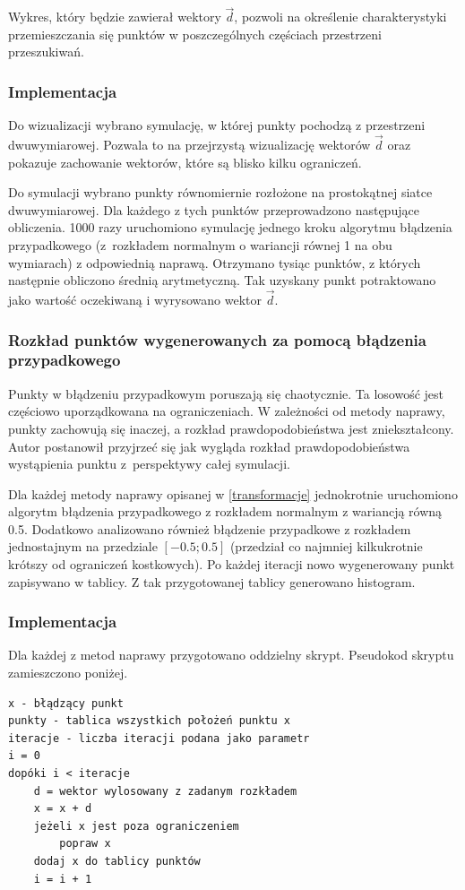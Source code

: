 \documentclass{mini}
\begin{document}
Wykres, który będzie zawierał wektory $\overrightarrow{d}$, pozwoli na określenie charakterystyki przemieszczania się punktów w poszczególnych częściach przestrzeni przeszukiwań.

\subsubsection*{Implementacja}
\hspace{3,4ex}Do wizualizacji wybrano symulację, w której punkty pochodzą z przestrzeni dwuwymiarowej. Pozwala to na przejrzystą wizualizację wektorów $\overrightarrow{d}$ oraz pokazuje zachowanie wektorów, które są blisko kilku ograniczeń.

Do symulacji wybrano punkty równomiernie rozłożone na prostokątnej siatce dwuwymiarowej. Dla każdego z tych punktów przeprowadzono następujące obliczenia. 1000 razy uruchomiono symulację jednego kroku algorytmu błądzenia przypadkowego (z~rozkładem normalnym o wariancji równej 1 na obu wymiarach) z odpowiednią naprawą. Otrzymano tysiąc punktów, z których następnie obliczono średnią arytmetyczną. Tak uzyskany punkt potraktowano jako wartość oczekiwaną i wyrysowano wektor $\overrightarrow{d}$.

\subsubsection{Rozkład punktów wygenerowanych za pomocą błądzenia przypadkowego}
\hspace{3,4ex}Punkty w błądzeniu przypadkowym poruszają się chaotycznie. Ta losowość jest częściowo uporządkowana na ograniczeniach. W zależności od metody naprawy, punkty zachowują się inaczej, a rozkład prawdopodobieństwa jest zniekształcony. Autor postanowił przyjrzeć się jak wygląda rozkład prawdopodobieństwa wystąpienia punktu z~perspektywy całej symulacji.

Dla każdej metody naprawy opisanej w \ref{transformacje} jednokrotnie uruchomiono algorytm błądzenia przypadkowego z rozkładem normalnym z wariancją równą 0.5. Dodatkowo analizowano również błądzenie przypadkowe z rozkładem jednostajnym na przedziale $[-0.5; 0.5]$ (przedział co najmniej kilkukrotnie krótszy od ograniczeń kostkowych). Po każdej iteracji nowo wygenerowany punkt zapisywano w tablicy. Z tak przygotowanej tablicy generowano histogram.

\subsubsection*{Implementacja}
\hspace{3,4ex}Dla każdej z metod naprawy przygotowano oddzielny skrypt. Pseudokod skryptu zamieszczono poniżej.
\begin{Verbatim}[baselinestretch=1.1]
x - błądzący punkt
punkty - tablica wszystkich położeń punktu x
iteracje - liczba iteracji podana jako parametr
i = 0
dopóki i < iteracje
	d = wektor wylosowany z zadanym rozkładem
	x = x + d
	jeżeli x jest poza ograniczeniem
		popraw x
	dodaj x do tablicy punktów
	i = i + 1
\end{Verbatim}
\end{document}
